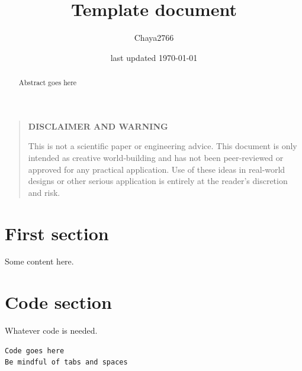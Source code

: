 \documentclass[a4paper]{article}
\title{Template document}
\author{Chaya2766}
\date{last updated \today}
\begin{document}
	\sffamily
	\hyphenchar{}
	\sloppy
	
	\maketitle
	
	\begin{center}
	\end{center}
	
	\textbf{
		\sloppy
		\hyphenchar{}
		}
	
	\vfill
	
	\begin{abstract}
		Abstract goes here
	\end{abstract}
	
	\vfill
	
	\begin{quote}
		\begin{center}
			\textbf{DISCLAIMER AND WARNING}
		\end{center}
		
		This is not a scientific paper or engineering advice.
		This document is only intended as creative world‑building and has not been peer‑reviewed or approved for any practical application.
		Use of these ideas in real‑world designs or other serious application is entirely at the reader’s discretion and risk.
	\end{quote}
	
	\vfill
	
	\tableofcontents
	
	\pagebreak
	
	\section{First section}
	
	Some content here.
    
	\pagebreak
	
	\section{Code section}
	
    Whatever code is needed.
    
	\begin{lstlisting}
Code goes here
Be mindful of tabs and spaces
	\end{lstlisting}
	
\end{document}
